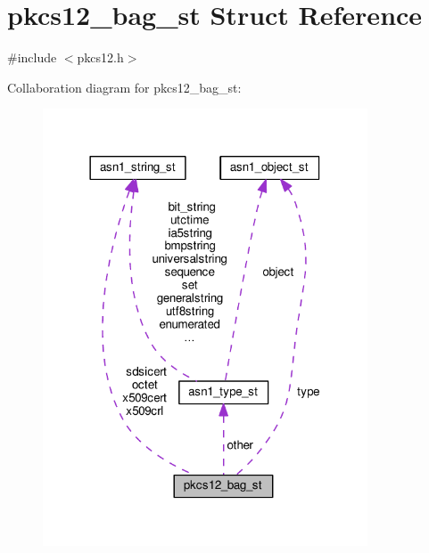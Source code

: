 \hypertarget{structpkcs12__bag__st}{}\section{pkcs12\+\_\+bag\+\_\+st Struct Reference}
\label{structpkcs12__bag__st}


{\ttfamily \#include $<$pkcs12.\+h$>$}



Collaboration diagram for pkcs12\+\_\+bag\+\_\+st\+:
\nopagebreak
\begin{figure}[H]
\begin{center}
\leavevmode
\includegraphics[width=273pt]{structpkcs12__bag__st__coll__graph}
\end{center}
\end{figure}
